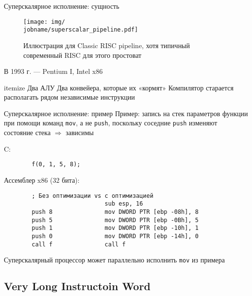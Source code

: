 \documentclass[xetex,aspectratio=43]{beamer}
\begin{document}
\begin{frame}{Суперскалярное исполнение: сущность}
    \begin{figure}
        \texttt{[image: img/\\jobname/superscalar\_pipeline.pdf]}
        \caption{Иллюстрация для Classic RISC pipeline, хотя типичный современный RISC для этого простоват}
    \end{figure}

    \pause

    В 1993 г. — Pentium I, Intel x86

    \begin{outline}{itemize}
        \1 Два АЛУ
        \1 Два конвейера, которые их «кормят»
        \1 Компилятор старается располагать рядом независимые инструкции
    \end{outline}

\end{frame}

\begin{frame}[fragile]{Суперскалярное исполнение: пример}
    Пример: запись на стек параметров функции при помощи команд \texttt{mov}, а не \texttt{push}, поскольку соседние \texttt{push} изменяют состояние стека $\Rightarrow$ зависимы

    C:
    \begin{verbatim}
        f(0, 1, 5, 8);
    \end{verbatim}

    Ассемблер x86 (32 бита):
    \begin{verbatim}
        ; Без оптимизации vs с оптимизацией
                             sub esp, 16
        push 8               mov DWORD PTR [ebp -08h], 8
        push 5               mov DWORD PTR [ebp -0Bh], 5
        push 1               mov DWORD PTR [ebp -10h], 1
        push 0               mov DWORD PTR [ebp -14h], 0
        call f               call f
    \end{verbatim}

    Суперскалярный процессор может параллельно исполнить \texttt{mov} из примера
\end{frame}

\subsection{Very Long Instructoin Word}
\end{document}
